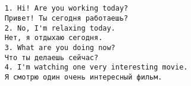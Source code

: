\subsection*{}
\begin{verbatim}
    1. Hi! Are you working today?
    Привет! Ты сегодня работаешь?
    2. No, I'm relaxing today.
    Нет, я отдыхаю сегодня.
    3. What are you doing now?
    Что ты делаешь сейчас?
    4. I'm watching one very interesting movie.
    Я смотрю один очень интересный фильм.
\end{verbatim}